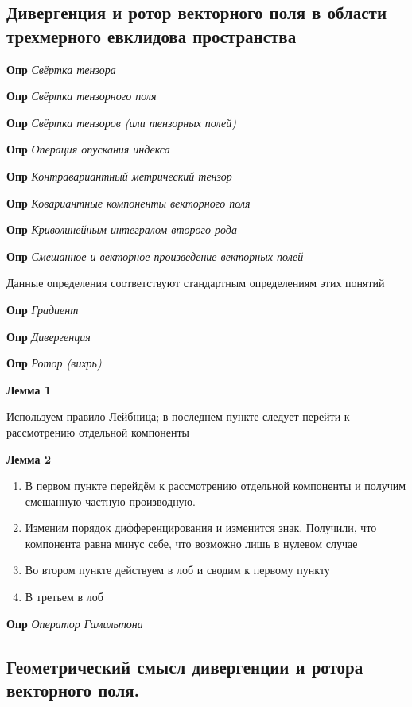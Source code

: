 \documentclass[a4paper, 14pt]{article}
\begin{document}
    \subsection{Дивергенция и ротор векторного поля в области трехмерного евклидова пространства}
    
    \textbf{Опр} \textit{Свёртка тензора}
    
    \textbf{Опр} \textit{Свёртка тензорного поля}
    
    \textbf{Опр} \textit{Свёртка тензоров (или тензорных полей)}
    
    \textbf{Опр} \textit{Операция опускания индекса}
    
    \textbf{Опр} \textit{Контравариантный метрический тензор}
    
    \textbf{Опр} \textit{Ковариантные компоненты векторного поля}
    
    \textbf{Опр} \textit{Криволинейным интегралом второго рода}
    
    \textbf{Опр} \textit{Смешанное и векторное произведение векторных полей}
    
    Данные определения соответствуют стандартным определениям этих понятий
    
    \textbf{Опр} \textit{Градиент}
    
    \textbf{Опр} \textit{Дивергенция}
    
    \textbf{Опр} \textit{Ротор (вихрь)}
    
    \textbf{Лемма 1}
    
    Используем правило Лейбница; в последнем пункте следует перейти к рассмотрению отдельной компоненты
    
    \textbf{Лемма 2}
    
    \begin{enumerate}
        \item В первом пункте перейдём к рассмотрению отдельной компоненты и получим смешанную частную производную.
        \item Изменим порядок дифференцирования и изменится знак.
        Получили, что компонента равна минус себе, что возможно лишь в нулевом случае
        \item Во втором пункте действуем в лоб и сводим к первому пункту
        \item В третьем в лоб
    \end{enumerate}
    
    \textbf{Опр} \textit{Оператор Гамильтона}
    
    \subsection{Геометрический смысл дивергенции и ротора векторного поля.}
    
\end{document}
